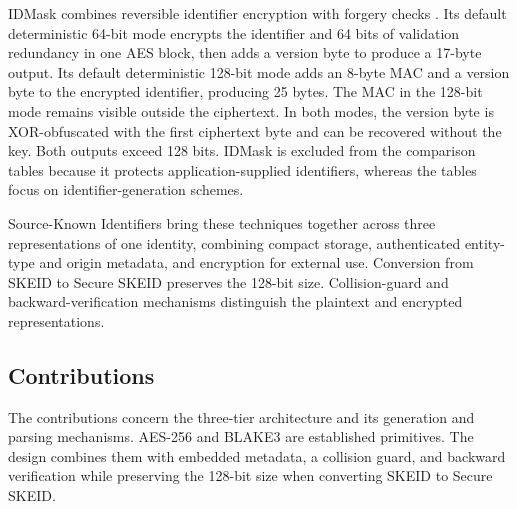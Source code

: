 \documentclass[a4paper,fleqn]{cas-sc}
\begin{document}
IDMask combines reversible identifier encryption with forgery checks
\citep{idmask}. Its default deterministic 64-bit mode encrypts the
identifier and 64 bits of validation redundancy in one AES block, then
adds a version byte to produce a 17-byte output. Its default
deterministic 128-bit mode adds an 8-byte MAC and a version byte to the
encrypted identifier, producing 25 bytes. The MAC in the 128-bit mode
remains visible outside the ciphertext. In both modes, the version byte
is XOR-obfuscated with the first ciphertext byte and can be recovered
without the key. Both outputs exceed 128 bits. IDMask is excluded from
the comparison tables because it protects application-supplied
identifiers, whereas the tables focus on identifier-generation schemes.

Source-Known Identifiers bring these techniques together across three
representations of one identity, combining compact storage,
authenticated entity-type and origin metadata, and encryption for
external use. Conversion from SKEID to Secure SKEID preserves the
128-bit size. Collision-guard and backward-verification mechanisms
distinguish the plaintext and encrypted representations.

\subsection{Contributions}\label{contributions}

The contributions concern the three-tier architecture and its generation
and parsing mechanisms. AES-256 and BLAKE3 are established primitives.
The design combines them with embedded metadata, a collision guard, and
backward verification while preserving the 128-bit size when converting
SKEID to Secure SKEID.
\end{document}
